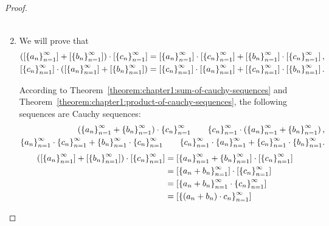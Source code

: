 \begin{proof}
\begin{enumerate}[label={(F\arabic*)},itemsep=0pt,topsep=0pt,start=5]
\begin{align*}
              \end{align*}
        \item We will prove that
              \[
                  \begin{split}
                      \left(\left[{{\left\{{a_{n}}\right\}}^{\infty}_{n=1}}\right] + \left[{{\left\{{b_{n}}\right\}}^{\infty}_{n=1}}\right]\right)\cdot\left[{{\left\{{c_{n}}\right\}}^{\infty}_{n=1}}\right] = \left[{{\left\{{a_{n}}\right\}}^{\infty}_{n=1}}\right]\cdot\left[{{\left\{{c_{n}}\right\}}^{\infty}_{n=1}}\right] + \left[{{\left\{{b_{n}}\right\}}^{\infty}_{n=1}}\right]\cdot\left[{{\left\{{c_{n}}\right\}}^{\infty}_{n=1}}\right], \\
                      \left[{{\left\{{c_{n}}\right\}}^{\infty}_{n=1}}\right]\cdot\left(\left[{{\left\{{a_{n}}\right\}}^{\infty}_{n=1}}\right] + \left[{{\left\{{b_{n}}\right\}}^{\infty}_{n=1}}\right]\right) = \left[{{\left\{{c_{n}}\right\}}^{\infty}_{n=1}}\right]\cdot\left[{{\left\{{a_{n}}\right\}}^{\infty}_{n=1}}\right] + \left[{{\left\{{c_{n}}\right\}}^{\infty}_{n=1}}\right]\cdot\left[{{\left\{{b_{n}}\right\}}^{\infty}_{n=1}}\right].
                  \end{split}
              \]

              According to Theorem~\ref{theorem:chapter1:sum-of-cauchy-sequences} and Theorem~\ref{theorem:chapter1:product-of-cauchy-sequences}, the following sequences are Cauchy sequences:
              \[
                  \begin{split}
                      \left({\left\{{a_{n}}\right\}}^{\infty}_{n=1} + {\left\{{b_{n}}\right\}}^{\infty}_{n=1}\right)\cdot{\left\{{c_{n}}\right\}}^{\infty}_{n=1} \qquad {\left\{{c_{n}}\right\}}^{\infty}_{n=1}\cdot\left({\left\{{a_{n}}\right\}}^{\infty}_{n=1} + {\left\{{b_{n}}\right\}}^{\infty}_{n=1}\right), \\
                      {\left\{{a_{n}}\right\}}^{\infty}_{n=1}\cdot{\left\{{c_{n}}\right\}}^{\infty}_{n=1} + {\left\{{b_{n}}\right\}}^{\infty}_{n=1}\cdot{\left\{{c_{n}}\right\}}^{\infty}_{n=1} \qquad {\left\{{c_{n}}\right\}}^{\infty}_{n=1}\cdot{\left\{{a_{n}}\right\}}^{\infty}_{n=1} + {\left\{{c_{n}}\right\}}^{\infty}_{n=1}\cdot{\left\{{b_{n}}\right\}}^{\infty}_{n=1}.
                  \end{split}
              \]
              \begin{align*}
                  \left(\class{\seq{a_{n}}} + \class{\seq{b_{n}}}\right)\cdot\class{\seq{c_{n}}} & = \class{\seq{a_{n}} + \seq{b_{n}}}\cdot\class{\seq{c_{n}}}                                                                     \\
                                                                                                 & = \class{\seq{a_{n} + b_{n}}}\cdot\class{\seq{c_{n}}}                                                                           \\
                                                                                                 & = \class{\seq{a_{n} + b_{n}}\cdot\seq{c_{n}}}                                                                                   \\
                                                                                                 & = \class{\seq{(a_{n} + b_{n})\cdot c_{n}}}                                                                                      \\

\end{align*}
\end{enumerate}
\end{proof}
